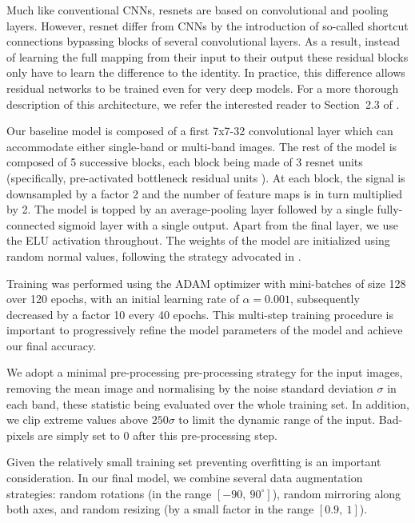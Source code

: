 \documentclass[useAMS,usenatbib]{mnras}
\begin{document}
Much like conventional CNNs, resnets are based on convolutional and pooling layers. However, resnet differ from CNNs by the introduction of so-called shortcut connections bypassing blocks of several convolutional layers. As a result, instead of learning the full mapping from their input to their output these residual blocks only have to learn the difference to the identity. In practice, this difference allows residual networks to be trained even for very deep models. For a more thorough description of this architecture, we refer the interested reader to Section~2.3 of \citet{Lanusse2017}.

Our baseline model is composed of a first 7x7-32 convolutional layer which can accommodate either single-band or multi-band images. The rest of the model is composed of 5 successive blocks, each block being made of 3 resnet units (specifically, pre-activated bottleneck residual units \citep{He2016}). At each block, the signal is downsampled by a factor 2 and the number of feature maps is in turn multiplied by 2. The model is topped by an average-pooling layer followed by a single fully-connected sigmoid layer with a single output. Apart from the final layer, we use the ELU activation throughout. The weights of the model are initialized using random normal values, following the strategy advocated in \citet{He2015a}. 

Training was performed using the ADAM optimizer with mini-batches of size 128 over 120 epochs, with an initial learning rate of $\alpha=0.001$, subsequently decreased by a factor 10 every 40 epochs. This multi-step training procedure is important to progressively refine the model parameters of the model and achieve our final accuracy.

We adopt a minimal pre-processing pre-processing strategy for the input images, removing the mean image and normalising by the noise standard deviation $\sigma$ in each band, these statistic being evaluated over the whole training set. In addition, we clip extreme values above $250 \sigma$ to limit the dynamic range of the input. Bad-pixels are simply set to 0 after this pre-processing step.

Given the relatively small training set preventing overfitting is an important consideration. In our final model, we combine several data augmentation strategies: random rotations (in the range $[-90, \ 90^\circ]$), random mirroring along both axes, and random resizing (by a small factor in the range $[0.9, \ 1]$).
\end{document}
